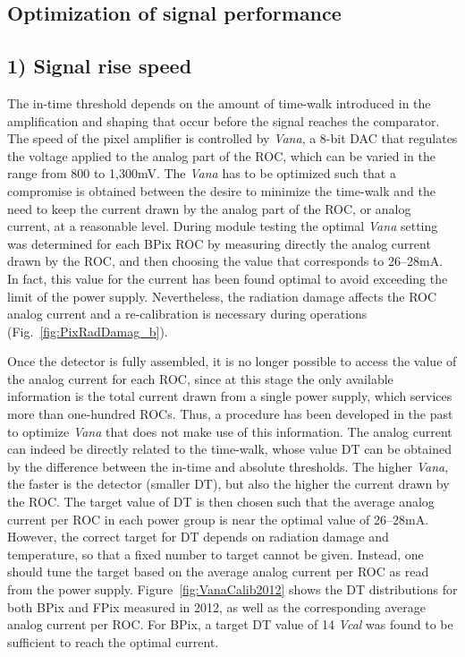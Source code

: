 \subsection{Optimization of signal performance}\label{subsec:calibPart2}

\subsection*{1) Signal rise speed}

The in-time threshold depends on the amount of time-walk introduced in the amplification and shaping that occur before the signal reaches the comparator.
The speed of the pixel amplifier is controlled by \textit{Vana}, a 8-bit DAC that regulates the voltage applied to the analog part of the ROC, which can be varied in the range from 800 to 1,300\unit{mV}.
The \textit{Vana} has to be optimized such that a compromise is obtained between the desire to minimize the time-walk and the need to keep the current drawn by the analog part of the ROC, or analog current, at a reasonable level.
During module testing the optimal \textit{Vana} setting was determined for each BPix ROC by measuring directly the analog current drawn by the ROC, and then choosing the value that corresponds to 26--28\unit{mA}.
In fact, this value for the current has been found optimal to avoid exceeding the limit of the power supply.
Nevertheless, the radiation damage affects the ROC analog current and a re-calibration is necessary during operations (Fig.~\ref{fig:PixRadDamag_b}). 

Once the detector is fully assembled, it is no longer possible to access the value of the analog current for each ROC, since at this stage the only available information is the total current drawn from a single power supply, which services more than one-hundred ROCs. Thus, a procedure has been developed in the past to optimize \textit{Vana} that does not make use of this information.
The analog current can indeed be directly related to the time-walk, whose value DT can be obtained by the difference between the in-time and absolute thresholds.
The higher \textit{Vana}, the faster is the detector (smaller DT), but also the higher the current drawn by the ROC.
The target value of DT is then chosen such that the average analog current per ROC in each power group is near the optimal value of 26--28\unit{mA}.
However, the correct target for DT depends on radiation damage and temperature, so that a fixed number to target cannot be given.
Instead, one should tune the target based on the average analog current per ROC as read from the power supply.
Figure~\ref{fig:VanaCalib2012} shows the DT distributions for both BPix and FPix measured in 2012, as well as the corresponding average analog current per ROC.
For BPix, a target DT value of 14 \textit{Vcal} was found to be sufficient to reach the optimal current.

